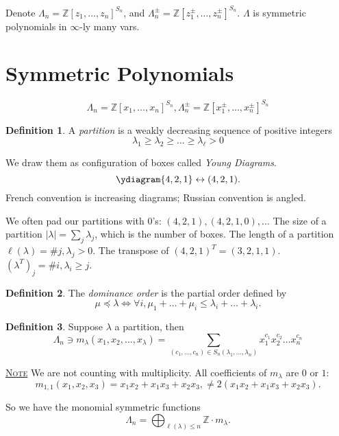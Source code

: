 \documentclass{report}
\newcommand{\Z}{\mathbb{Z}}
\newcommand{\fancyem}[1]{\underline{\textsc{#1}}}
\theoremstyle{definition}
\newtheorem{definition}{Definition}[section]
\theoremstyle{remark}
\numberwithin{equation}{section}
\begin{document}
Denote $\Lambda_n = \Z[z_1, \ldots, z_n]^{S_n}$, and $\Lambda^{\pm}_n = \Z[z_1^{\pm}, \ldots, z_n^{\pm}]^{S_n}$. $\Lambda$ is symmetric polynomials in $\infty$-ly many vars.

\section{Symmetric Polynomials}
\[
    \Lambda_n = \Z[x_1, \ldots, x_n]^{S_n}, \Lambda^{\pm}_n = \Z[x_1^{\pm}, \ldots, x_n^{\pm}]^{S_n}   
\]
\begin{definition}
    A \emph{partition} is a weakly decreasing sequence of positive integers \[
        \lambda_1 \geq \lambda_2 \geq \ldots \geq \lambda_\ell > 0    
    \]
\end{definition}
We draw them as configuration of boxes called \emph{Young Diagrams}.
\[
    \ydiagram{4, 2, 1} \leftrightarrow (4, 2, 1). 
\]
French convention is increasing diagrams; Russian convention is angled.

We often pad our partitions with $0$'s: $(4, 2, 1), (4, 2, 1, 0), \ldots$ The size of a partition $|\lambda| = \sum_j \lambda_j$, which is the number of boxes. The length of a partition $\ell(\lambda) = \# j, \lambda_j > 0$. The transpose of $(4, 2, 1)^T = (3, 2, 1, 1)$.
$(\lambda^T)_j = \# i, \lambda_i \geq j$.

\begin{definition}
    The \emph{dominance order} is the partial order defined by
    \[
        \mu \preceq \lambda \iff \forall i, \mu_1 + \ldots + \mu_i \leq \lambda_i + \ldots + \lambda_i.    
    \]
\end{definition}
\begin{definition}
    Suppose $\lambda$ a partition, then \[
        \Lambda_n \ni m_\lambda(x_1, x_2, \ldots, x_\lambda) = \sum_{(c_1, \ldots, c_n) \in S_n(\lambda_1, \ldots, \lambda_n)} x_1^{c_1} x_2^{c_2}\ldots x_n^{c_n}    
    \]
\end{definition}

\fancyem{Note} We are not counting with multiplicity. All coefficients of $m_\lambda$ are $0$ or $1$:
\[
    m_{1,1}(x_1, x_2, x_3) = x_1x_2 + x_1x_3 + x_2x_3, \neq 2(x_1x_2 + x_1x_3 + x_2x_3).  
\]

So we have the monomial symmetric functions \[
    \Lambda_n = \bigoplus_{\ell(\lambda) \leq n} \Z \cdot m_\lambda.   
\]
\end{document}

